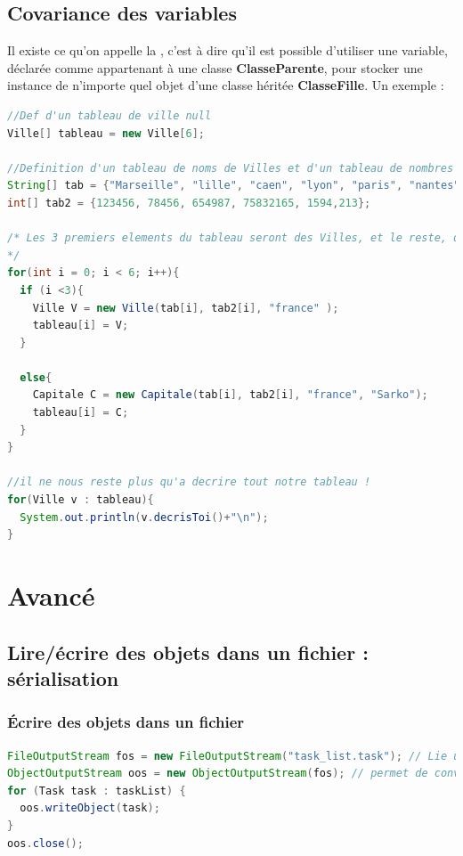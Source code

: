\documentclass[a4paper,twoside]{article}
\begin{document}
\subsection{Covariance des variables}
Il existe ce qu'on appelle la , c'est à dire qu'il est possible d'utiliser une variable, déclarée comme appartenant à une classe \textbf{ClasseParente}, pour stocker une instance de n'importe quel objet d'une classe héritée \textbf{ClasseFille}. Un exemple :
\begin{lstlisting}[language=java]
//Def d'un tableau de ville null
Ville[] tableau = new Ville[6];
    
//Definition d'un tableau de noms de Villes et d'un tableau de nombres d'habitants
String[] tab = {"Marseille", "lille", "caen", "lyon", "paris", "nantes"};
int[] tab2 = {123456, 78456, 654987, 75832165, 1594,213};

/* Les 3 premiers elements du tableau seront des Villes, et le reste, des capitales
*/
for(int i = 0; i < 6; i++){
  if (i <3){
    Ville V = new Ville(tab[i], tab2[i], "france" );
    tableau[i] = V;
  }

  else{
    Capitale C = new Capitale(tab[i], tab2[i], "france", "Sarko");
    tableau[i] = C;
  }
}

//il ne nous reste plus qu'a decrire tout notre tableau !
for(Ville v : tableau){
  System.out.println(v.decrisToi()+"\n");
}
\end{lstlisting}

\section{Avancé}
\subsection{Lire/écrire des objets dans un fichier : sérialisation}
\subsubsection{Écrire des objets dans un fichier}

\begin{lstlisting}[language=java]
FileOutputStream fos = new FileOutputStream("task_list.task"); // Lie un flux de donnees a un fichier physique
ObjectOutputStream oos = new ObjectOutputStream(fos); // permet de convertir un objet en flux de donnees
for (Task task : taskList) {
  oos.writeObject(task);
}
oos.close();
\end{lstlisting}
\end{document}
